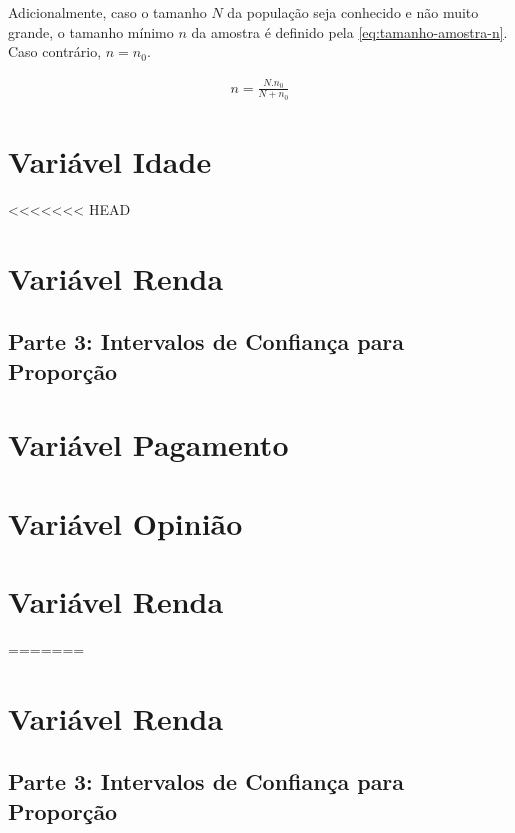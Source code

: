 \documentclass[10pt,a4paper,oneside]{article}
\begin{document}
	Adicionalmente, caso o tamanho $N$ da população seja conhecido e não muito grande,
	o tamanho mínimo $n$ da amostra é definido pela \autoref{eq:tamanho-amostra-n}.
	Caso contrário, $n = n_{0}$.

	\begin{align}
		\label{eq:tamanho-amostra-n}
		n = \frac{N . n_0}{N + n_0}
	\end{align}
	

\section{Variável Idade}
\label{questao:2}


<<<<<<< HEAD
 \section{Variável Renda}
 \label{questao:3}
 

 \begin{center}
 	\section*{Parte 3: Intervalos de Confiança para Proporção}
 \end{center}

 \section{Variável Pagamento}
 \label{questao:4}
 

 \section{Variável Opinião}
 \label{questao:5}
 
 
 \section{Variável Renda}
 \label{questao:6}
 
=======
\section{Variável Renda}
\label{questao:3}


\newpage
\begin{center}
	\section*{Parte 3: Intervalos de Confiança para Proporção}
\end{center}
\end{document}
